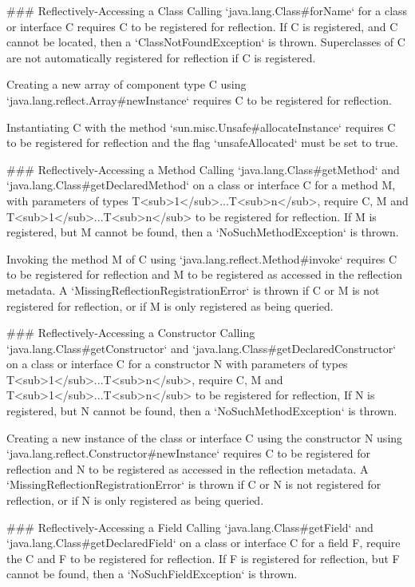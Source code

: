 ### Reflectively-Accessing a Class
Calling `java.lang.Class#forName` for a class or interface C requires C to be registered for reflection.
If C is registered, and C cannot be located, then a `ClassNotFoundException` is thrown. 
Superclasses of C are not automatically registered for reflection if C is registered.

Creating a new array of component type C using `java.lang.reflect.Array#newInstance` requires C to be 
registered for reflection.

Instantiating C with the method `sun.misc.Unsafe#allocateInstance` requires C to be 
registered for reflection and the flag `unsafeAllocated` must be set to true.

### Reflectively-Accessing a Method
Calling `java.lang.Class#getMethod` and `java.lang.Class#getDeclaredMethod` on a class or interface C for a method M, 
with parameters of types T<sub>1</sub>...T<sub>n</sub>, require C, M and T<sub>1</sub>...T<sub>n</sub> to be registered 
for reflection.
If M is registered, but M cannot be found, then a `NoSuchMethodException` is thrown.

Invoking the method M of C using `java.lang.reflect.Method#invoke` requires C to be registered for reflection
and M to be registered as accessed in the reflection metadata.
A `MissingReflectionRegistrationError` is thrown if C or M is not registered for reflection, or 
if M is only registered as being queried.

### Reflectively-Accessing a Constructor
Calling `java.lang.Class#getConstructor` and `java.lang.Class#getDeclaredConstructor` on a class or interface C 
for a constructor N with parameters of types T<sub>1</sub>...T<sub>n</sub>, require C, M and T<sub>1</sub>...T<sub>n</sub>
to be registered for reflection,
If N is registered, but N cannot be found, then a `NoSuchMethodException` is thrown.

Creating a new instance of the class or interface C using the constructor N using
`java.lang.reflect.Constructor#newInstance` requires C to be registered for reflection
and N to be registered as accessed in the reflection metadata.
A `MissingReflectionRegistrationError` is thrown if C or N is not registered for reflection, or
if N is only registered as being queried.

### Reflectively-Accessing a Field
Calling `java.lang.Class#getField` and `java.lang.Class#getDeclaredField` on a class or interface C for a field F,
require the C and F to be registered for reflection.
If F is registered for reflection, but F cannot be found, then a `NoSuchFieldException` is thrown.

